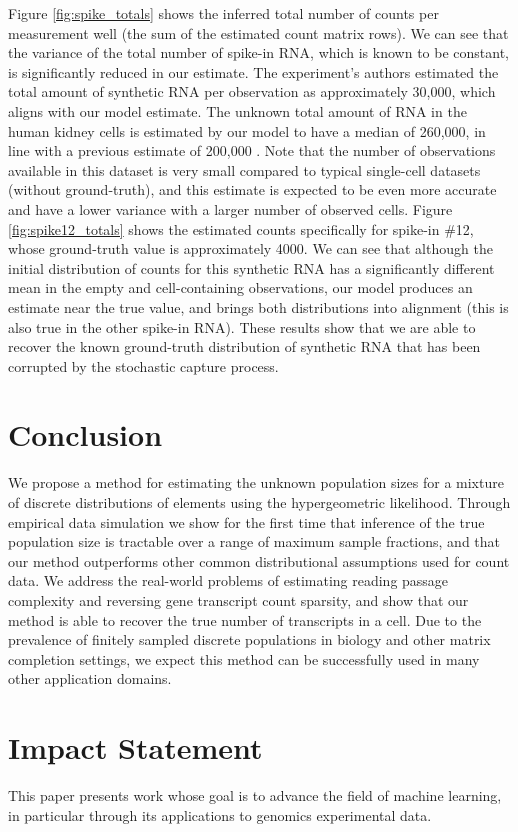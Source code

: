 \documentclass{article}
\theoremstyle{plain}
\theoremstyle{definition}
\theoremstyle{remark}
\begin{document}
Figure \ref{fig:spike_totals} shows the inferred total number of counts per measurement well (the sum of the estimated count matrix rows). We can see that the variance of the total number of spike-in RNA, which is known to be constant, is significantly reduced in our estimate. The experiment's authors estimated the total amount of synthetic RNA per observation as approximately 30,000, which aligns with our model estimate. The unknown total amount of RNA in the human kidney cells is estimated by our model to have a median of 260,000, in line with a previous estimate of 200,000 \cite{shapiro2013single}. Note that the number of observations available in this dataset is very small compared to typical single-cell datasets (without ground-truth), and this estimate is expected to be even more accurate and have a lower variance with a larger number of observed cells. Figure \ref{fig:spike12_totals} shows the estimated counts specifically for spike-in \#12, whose ground-truth value is approximately 4000. We can see that although the initial distribution of counts for this synthetic RNA has a significantly different mean in the empty and cell-containing observations, our model produces an estimate near the true value, and brings both distributions into alignment (this is also true in the other spike-in RNA). These results show that we are able to recover the known ground-truth distribution of synthetic RNA that has been corrupted by the stochastic capture process.

\section{Conclusion}
We propose a method for estimating the unknown population sizes for a mixture of discrete distributions of elements using the hypergeometric likelihood. Through empirical data simulation we show for the first time that inference of the true population size is tractable over a range of maximum sample fractions, and that our method outperforms other common distributional assumptions used for count data. We address the real-world problems of estimating reading passage complexity and reversing gene transcript count sparsity, and show that our method is able to recover the true number of transcripts in a cell. Due to the prevalence of finitely sampled discrete populations in biology and other matrix completion settings, we expect this method can be successfully used in many other application domains.

\section*{Impact Statement}
This paper presents work whose goal is to advance the field of machine learning, in particular through its applications to genomics experimental data.
\end{document}
